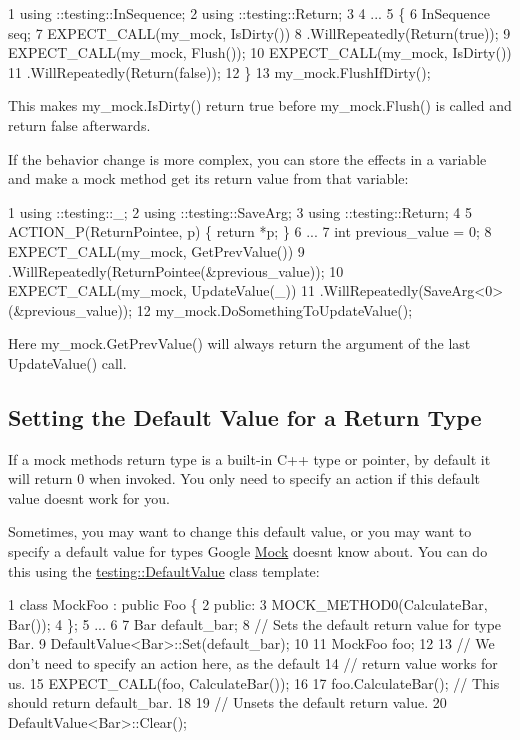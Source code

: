 \begin{DoxyCode}
1 using ::testing::InSequence;
2 using ::testing::Return;
3 
4 ...
5   \{
6     InSequence seq;
7     EXPECT\_CALL(my\_mock, IsDirty())
8         .WillRepeatedly(Return(true));
9     EXPECT\_CALL(my\_mock, Flush());
10     EXPECT\_CALL(my\_mock, IsDirty())
11         .WillRepeatedly(Return(false));
12   \}
13   my\_mock.FlushIfDirty();
\end{DoxyCode}


This makes {\ttfamily my\+\_\+mock.\+Is\+Dirty()} return {\ttfamily true} before {\ttfamily my\+\_\+mock.\+Flush()} is called and return {\ttfamily false} afterwards.

If the behavior change is more complex, you can store the effects in a variable and make a mock method get its return value from that variable\+:


\begin{DoxyCode}
1 using ::testing::\_;
2 using ::testing::SaveArg;
3 using ::testing::Return;
4 
5 ACTION\_P(ReturnPointee, p) \{ return *p; \}
6 ...
7   int previous\_value = 0;
8   EXPECT\_CALL(my\_mock, GetPrevValue())
9       .WillRepeatedly(ReturnPointee(&previous\_value));
10   EXPECT\_CALL(my\_mock, UpdateValue(\_))
11       .WillRepeatedly(SaveArg<0>(&previous\_value));
12   my\_mock.DoSomethingToUpdateValue();
\end{DoxyCode}


Here {\ttfamily my\+\_\+mock.\+Get\+Prev\+Value()} will always return the argument of the last {\ttfamily Update\+Value()} call.

\subsection*{Setting the Default Value for a Return Type}

If a mock method\textquotesingle{}s return type is a built-\/in C++ type or pointer, by default it will return 0 when invoked. You only need to specify an action if this default value doesn\textquotesingle{}t work for you.

Sometimes, you may want to change this default value, or you may want to specify a default value for types Google \hyperlink{classMock}{Mock} doesn\textquotesingle{}t know about. You can do this using the {\ttfamily \hyperlink{classtesting_1_1DefaultValue}{testing\+::\+Default\+Value}} class template\+:


\begin{DoxyCode}
1 class MockFoo : public Foo \{
2  public:
3   MOCK\_METHOD0(CalculateBar, Bar());
4 \};
5 ...
6 
7   Bar default\_bar;
8   // Sets the default return value for type Bar.
9   DefaultValue<Bar>::Set(default\_bar);
10 
11   MockFoo foo;
12 
13   // We don't need to specify an action here, as the default
14   // return value works for us.
15   EXPECT\_CALL(foo, CalculateBar());
16 
17   foo.CalculateBar();  // This should return default\_bar.
18 
19   // Unsets the default return value.
20   DefaultValue<Bar>::Clear();
\end{DoxyCode}


